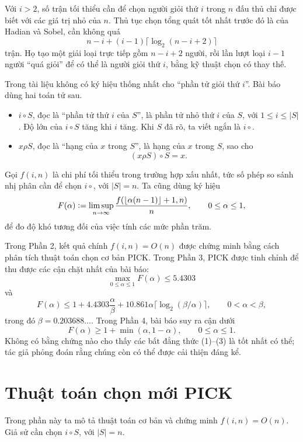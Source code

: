 \documentclass[11pt]{article}
\newcommand{\PICK}{\textsc{PICK}}
\newcommand{\defeq}{\mathrel{\vcentcolon=}}
\begin{document}
Với \(i>2\), số trận tối thiểu cần để chọn người giỏi thứ \(i\) trong \(n\)
đấu thủ chỉ được biết với các giá trị nhỏ của \(n\). Thủ tục chọn tổng quát
tốt nhất trước đó là của Hadian và Sobel, cần không quá
\[
  n-i+(i-1)\lceil\log_2(n-i+2)\rceil
\]
trận. Họ tạo một giải loại trực tiếp gồm \(n-i+2\) người, rồi lần lượt loại
\(i-1\) người ``quá giỏi'' để có thể là người giỏi thứ \(i\), bằng kỹ thuật
chọn có thay thế.

Trong tài liệu không có ký hiệu thống nhất cho ``phần tử giỏi thứ \(i\)''.
Bài báo dùng hai toán tử sau.

\begin{itemize}
  \item \(i\circ S\), đọc là ``phần tử thứ \(i\) của \(S\)'', là phần tử nhỏ
  thứ \(i\) của \(S\), với \(1\le i\le |S|\). Độ lớn của \(i\circ S\) tăng
  khi \(i\) tăng. Khi \(S\) đã rõ, ta viết ngắn là \(i\circ\).
  \item \(x\rho S\), đọc là ``hạng của \(x\) trong \(S\)'', là hạng của
  \(x\) trong \(S\), sao cho
  \[
    (x\rho S)\circ S=x.
  \]
\end{itemize}

Gọi \(f(i,n)\) là chi phí tối thiểu trong trường hợp xấu nhất, tức số phép so
sánh nhị phân cần để chọn \(i\circ\), với \(|S|=n\). Ta cũng dùng ký hiệu
\[
  F(\alpha)\defeq
  \limsup_{n\to\infty}
  \frac{f(\lfloor \alpha(n-1)\rfloor+1,n)}{n},
  \qquad 0\le\alpha\le 1,
\]
để đo độ khó tương đối của việc tính các mức phần trăm.

Trong Phần 2, kết quả chính \(f(i,n)=O(n)\) được chứng minh bằng cách phân tích
thuật toán chọn cơ bản \PICK. Trong Phần 3, \PICK{} được tinh chỉnh để thu được
các cận chặt nhất của bài báo:
\[
  \max_{0\le\alpha\le 1} F(\alpha)\le 5.4303
  \tag{1}
\]
và
\[
  F(\alpha)\le
  1+4.4303\frac{\alpha}{\beta}
  +10.861\alpha\lceil\log_2(\beta/\alpha)\rceil,
  \qquad 0<\alpha<\beta,
  \tag{2}
\]
trong đó \(\beta=0.203688\ldots\). Trong Phần 4, bài báo suy ra cận dưới
\[
  F(\alpha)\ge 1+\min(\alpha,1-\alpha),
  \qquad 0\le\alpha\le 1.
  \tag{3}
\]
Không có bằng chứng nào cho thấy các bất đẳng thức (1)--(3) là tốt nhất có thể;
tác giả phỏng đoán rằng chúng còn có thể được cải thiện đáng kể.

\section{Thuật toán chọn mới \PICK}

Trong phần này ta mô tả thuật toán cơ bản và chứng minh \(f(i,n)=O(n)\). Giả
sử cần chọn \(i\circ S\), với \(|S|=n\).
\end{document}
